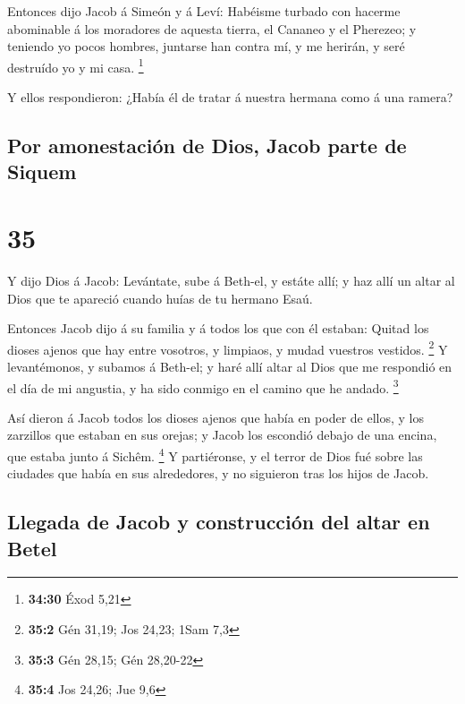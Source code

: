  Entonces dijo Jacob á Simeón y á Leví: Habéisme turbado
con hacerme abominable á los moradores de aquesta tierra, el Cananeo y
el Pherezeo; y teniendo yo pocos hombres, juntarse han contra mí, y me
herirán, y seré destruído yo y mi casa. \footnote{\textbf{34:30} Éxod
  5,21}

 Y ellos respondieron: ¿Había él de tratar á nuestra
hermana como á una ramera?

\hypertarget{por-amonestaciuxf3n-de-dios-jacob-parte-de-siquem}{%
\subsection{Por amonestación de Dios, Jacob parte de
Siquem}\label{por-amonestaciuxf3n-de-dios-jacob-parte-de-siquem}}

\hypertarget{section-34}{%
\section{35}\label{section-34}}

 Y dijo Dios á Jacob: Levántate, sube á Beth-el, y estáte
allí; y haz allí un altar al Dios que te apareció cuando huías de tu
hermano Esaú.

 Entonces Jacob dijo á su familia y á todos los que con él
estaban: Quitad los dioses ajenos que hay entre vosotros, y limpiaos, y
mudad vuestros vestidos. \footnote{\textbf{35:2} Gén 31,19; Jos 24,23;
  1Sam 7,3}  Y levantémonos, y subamos á Beth-el; y haré
allí altar al Dios que me respondió en el día de mi angustia, y ha sido
conmigo en el camino que he andado. \footnote{\textbf{35:3} Gén 28,15;
  Gén 28,20-22}

 Así dieron á Jacob todos los dioses ajenos que había en
poder de ellos, y los zarzillos que estaban en sus orejas; y Jacob los
escondió debajo de una encina, que estaba junto á Sichêm. \footnote{\textbf{35:4}
  Jos 24,26; Jue 9,6}  Y partiéronse, y el terror de Dios
fué sobre las ciudades que había en sus alrededores, y no siguieron tras
los hijos de Jacob.

\hypertarget{llegada-de-jacob-y-construcciuxf3n-del-altar-en-betel}{%
\subsection{Llegada de Jacob y construcción del altar en
Betel}\label{llegada-de-jacob-y-construcciuxf3n-del-altar-en-betel}}

